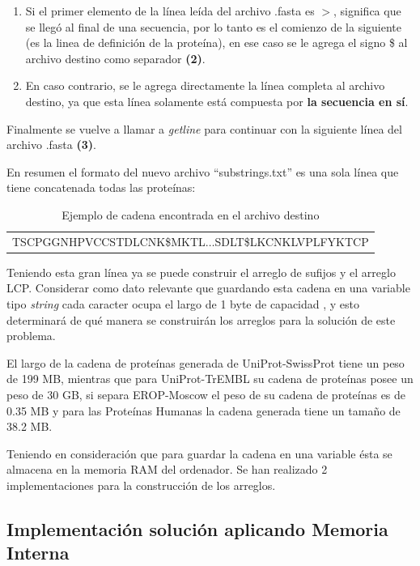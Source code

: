 \begin{enumerate}
\item Si el primer elemento de la línea leída del archivo .fasta es $>$, significa que se llegó al final de una secuencia, por lo tanto es el comienzo de la siguiente (es la linea de definición de la proteína), en ese caso se le agrega el signo \$ al archivo destino como separador \textbf{(2)}. 
\item En caso contrario, se le agrega directamente la línea completa al archivo destino, ya que esta línea solamente está compuesta por \textbf{la secuencia en sí}.
\end{enumerate}

Finalmente se vuelve a llamar a \textit{getline} para continuar con la siguiente línea del archivo .fasta \textbf{(3)}.

En resumen el formato del nuevo archivo ``substrings.txt'' es una sola línea que tiene concatenada todas las proteínas:

\begin{table}[h]
\centering
\label{propuesta-23}
\begin{tabular}{c}
TSCPGGNHPVCCSTDLCNK\$MKTL$\ldots$SDLT\$LKCNKLVPLFYKTCP\\ 
\end{tabular}
\caption{Ejemplo de cadena encontrada en el archivo destino}
\end{table}

Teniendo esta gran línea ya se puede construir el arreglo de sufijos y el arreglo LCP. Considerar como dato relevante que guardando esta cadena en una variable tipo \textit{string} cada caracter ocupa el largo de 1 byte de capacidad \cite{manipulatingstrings}, y esto determinará de qué manera se construirán los arreglos para la solución de este problema.

El largo de la cadena de proteínas generada de UniProt-SwissProt tiene un peso de 199 MB, mientras que para UniProt-TrEMBL su cadena de proteínas posee un peso de 30 GB, si separa EROP-Moscow el peso de su cadena de proteínas es de 0.35 MB y para las Proteínas Humanas la cadena generada tiene un tamaño de 38.2 MB.

Teniendo en consideración que para guardar la cadena en una variable ésta se almacena en la memoria RAM del ordenador. Se han realizado 2 implementaciones para la construcción de los arreglos.

\subsection{Implementación solución aplicando Memoria Interna}

